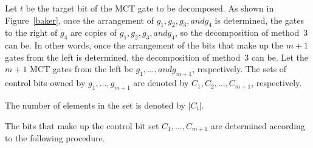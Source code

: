 Let $t$ be the target bit of the MCT gate to be decomposed.
As shown in Figure~\ref{baker}, once the arrangement of $g_{1}, g_{2}, g_{3}, and g_{4}$ is determined,
the gates to the right of $g_{4}$ are copies of $g_{1}, g_{2}, g_{3}, and g_{4}$, so the decomposition of method~3 can be.
In other words, once the arrangement of the bits that make up the $m+1$ gates from the left is determined, the decomposition of method~3 can be.
Let the $m+1$ MCT gates from the left be $g_{1}, \dots, and g_{m+1}$, respectively.
The sets of control bits owned by $g_{1},\dots ,g_{m+1}$ are denoted by $C_{1}, C_{2},\dots ,C_{m+1}$, respectively.

The number of elements in the set is denoted by $|C_{i}|$.

The bits that make up the control bit set $C_{1},\dots ,C_{m+1}$ are determined according to the following procedure.

